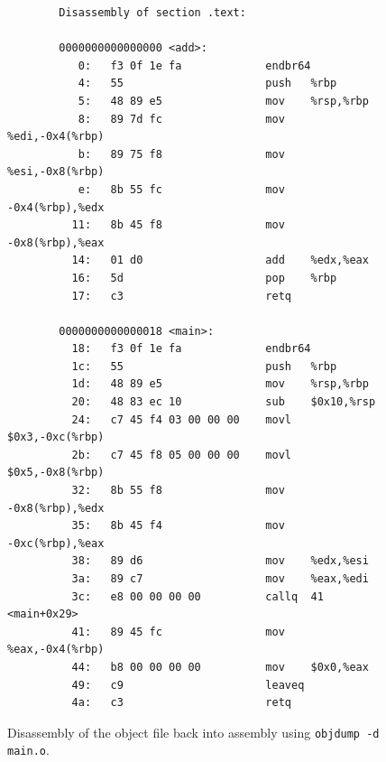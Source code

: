 \documentclass{article}
\begin{document}
    \begin{figure}[H]
      \centering 
      \begin{lstlisting}
        Disassembly of section .text:

        0000000000000000 <add>:
           0:	f3 0f 1e fa          	endbr64 
           4:	55                   	push   %rbp
           5:	48 89 e5             	mov    %rsp,%rbp
           8:	89 7d fc             	mov    %edi,-0x4(%rbp)
           b:	89 75 f8             	mov    %esi,-0x8(%rbp)
           e:	8b 55 fc             	mov    -0x4(%rbp),%edx
          11:	8b 45 f8             	mov    -0x8(%rbp),%eax
          14:	01 d0                	add    %edx,%eax
          16:	5d                   	pop    %rbp
          17:	c3                   	retq   

        0000000000000018 <main>:
          18:	f3 0f 1e fa          	endbr64 
          1c:	55                   	push   %rbp
          1d:	48 89 e5             	mov    %rsp,%rbp
          20:	48 83 ec 10          	sub    $0x10,%rsp
          24:	c7 45 f4 03 00 00 00 	movl   $0x3,-0xc(%rbp)
          2b:	c7 45 f8 05 00 00 00 	movl   $0x5,-0x8(%rbp)
          32:	8b 55 f8             	mov    -0x8(%rbp),%edx
          35:	8b 45 f4             	mov    -0xc(%rbp),%eax
          38:	89 d6                	mov    %edx,%esi
          3a:	89 c7                	mov    %eax,%edi
          3c:	e8 00 00 00 00       	callq  41 <main+0x29>
          41:	89 45 fc             	mov    %eax,-0x4(%rbp)
          44:	b8 00 00 00 00       	mov    $0x0,%eax
          49:	c9                   	leaveq 
          4a:	c3                   	retq  
      \end{lstlisting}
      \caption{Disassembly of the object file back into assembly using \texttt{objdump -d main.o}. }
      \label{fig:disassembly_example-2}
    \end{figure}
\end{document}
